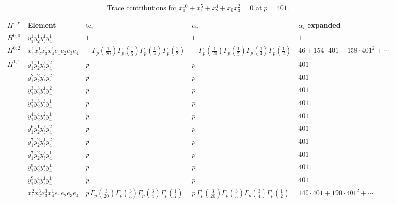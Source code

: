 \documentclass[11pt]{article}
\begin{document}
\begin{table}[ht]
\centering
\caption{Trace contributions for $x_0^{10} + x_1^{5} + x_2^{4} + x_0 x_3^{2} = 0$ at $p=401$.}\label{tab:deformed-56}
\renewcommand{\arraystretch}{1.1}
{\scriptsize
\begin{tabular}{@{}lllll@{}}
\toprule
$H^{s,r}$ & Element & $\mathrm{tc}_i$ & $\alpha_i$ & $\alpha_i$ expanded \\
\midrule
$H^{0,0}$ & $y_{1}^{1} y_{2}^{1} y_{3}^{1} y_{4}^{1}$ & $1$ & $1$ & $1$ \\
\midrule
$H^{0,2}$ & $x_{1}^{1} x_{2}^{1} x_{3}^{1} x_{4}^{1}  e_{1} e_{2} e_{3} e_{4}$ & $- \, \Gamma_p \left( \frac{1}{20} \right) \Gamma_p \left( \frac{1}{5} \right) \Gamma_p \left( \frac{1}{4} \right) \Gamma_p \left( \frac{1}{2} \right)$ & $- \, \Gamma_p \left( \frac{1}{20} \right) \Gamma_p \left( \frac{1}{5} \right) \Gamma_p \left( \frac{1}{4} \right) \Gamma_p \left( \frac{1}{2} \right)$ & $46{+}154{\cdot}401{+}158{\cdot}401^{2}{+}\cdots$ \\
\midrule
$H^{1,1}$ & $y_{1}^{1} y_{2}^{1} y_{3}^{3} y_{4}^{2}$ & $p \,$ & $p \,$ & $401$ \\
 & $y_{1}^{2} y_{2}^{2} y_{3}^{2} y_{4}^{2}$ & $p \,$ & $p \,$ & $401$ \\
 & $y_{1}^{3} y_{2}^{3} y_{3}^{1} y_{4}^{2}$ & $p \,$ & $p \,$ & $401$ \\
 & $y_{1}^{3} y_{2}^{3} y_{3}^{3} y_{4}^{1}$ & $p \,$ & $p \,$ & $401$ \\
 & $y_{1}^{4} y_{2}^{4} y_{3}^{2} y_{4}^{1}$ & $p \,$ & $p \,$ & $401$ \\
 & $y_{1}^{6} y_{2}^{1} y_{3}^{2} y_{4}^{2}$ & $p \,$ & $p \,$ & $401$ \\
 & $y_{1}^{7} y_{2}^{2} y_{3}^{1} y_{4}^{2}$ & $p \,$ & $p \,$ & $401$ \\
 & $y_{1}^{7} y_{2}^{2} y_{3}^{3} y_{4}^{1}$ & $p \,$ & $p \,$ & $401$ \\
 & $y_{1}^{8} y_{2}^{3} y_{3}^{2} y_{4}^{1}$ & $p \,$ & $p \,$ & $401$ \\
 & $y_{1}^{9} y_{2}^{4} y_{3}^{1} y_{4}^{1}$ & $p \,$ & $p \,$ & $401$ \\
 & $x_{1}^{2} x_{2}^{3} x_{3}^{3} x_{4}^{1}  e_{1} e_{2} e_{3} e_{4}$ & $p \, \Gamma_p \left( \frac{3}{20} \right) \Gamma_p \left( \frac{3}{5} \right) \Gamma_p \left( \frac{3}{4} \right) \Gamma_p \left( \frac{1}{2} \right)$ & $p \, \Gamma_p \left( \frac{3}{20} \right) \Gamma_p \left( \frac{3}{5} \right) \Gamma_p \left( \frac{3}{4} \right) \Gamma_p \left( \frac{1}{2} \right)$ & $149{\cdot}401{+}190{\cdot}401^{2}{+}\cdots$ \\

\end{tabular}}
\end{table}
\end{document}
